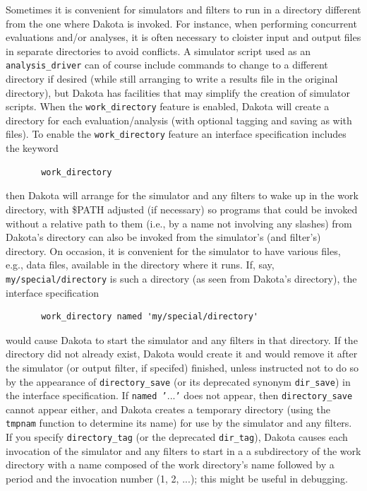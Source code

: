 Sometimes it is convenient for simulators and filters to run in a
directory different from the one where Dakota is invoked.  For instance,
when performing concurrent evaluations and/or analyses, it is often
necessary to cloister input and output files in separate directories to
avoid conflicts.  A simulator script used as an \texttt{analysis\_driver}
can of course include commands to change to a different directory if
desired (while still arranging to write a results file in the original
directory), but Dakota has facilities that may simplify the creation of
simulator scripts.  When the \texttt{work\_directory} feature is enabled,
Dakota will create a directory for each evaluation/analysis (with
optional tagging and saving as with files).  To enable the
\texttt{work\_directory} feature an interface specification includes
the keyword
\begin{small}
\begin{verbatim}
       work_directory
\end{verbatim}
\end{small}
then Dakota will arrange for the simulator and any filters to
wake up in the work directory, with \$PATH adjusted (if necessary)
so programs that could be invoked without a relative
path to them (i.e., by a name not involving any slashes) from
Dakota's directory can also be invoked from the simulator's (and filter's)
directory.  On occasion, it is convenient for the simulator to have
various files, e.g., data files, available in the directory where it
runs.  If, say, \texttt{my/special/directory} is such a directory
(as seen from Dakota's directory), the interface specification
\begin{small}
\begin{verbatim}
       work_directory named 'my/special/directory'
\end{verbatim}
\end{small}
would cause Dakota to start the simulator and any filters in that
directory.  If the directory did not already exist, Dakota would
create it and would remove it after the simulator (or output filter,
if specifed) finished, unless instructed not to do so by the
appearance of \texttt{directory\_save} (or its deprecated synonym
\texttt{dir\_save}) in the interface specification.  If \texttt{named
  '$...$'} does not appear, then \texttt{directory\_save} cannot
appear either, and Dakota creates a temporary directory (using the
\texttt{tmpnam} function to determine its name) for use by the
simulator and any filters.  If you specify \texttt{directory\_tag} (or
the deprecated \texttt{dir\_tag}), Dakota causes each invocation of
the simulator and any filters to start in a a subdirectory of the work
directory with a name composed of the work directory's name followed
by a period and the invocation number (1, 2, $...$); this might be
useful in debugging.

